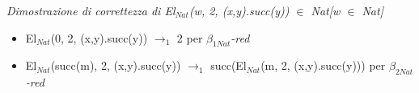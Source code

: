 \small
\begin{prooftree}
\end{prooftree}
\noindent
\normalsize \textit{Dimostrazione di correttezza di El$_{Nat}$(w, 2, (x,y).succ(y)) $\in$ Nat[w $\in$ Nat]}
\begin{itemize}
\item El$_{Nat}$(0, 2, (x,y).succ(y)) $\rightarrow_1$ 2 per \textit{$\beta_{1Nat}$-red}
\item El$_{Nat}$(succ(m), 2, (x,y).succ(y)) $\rightarrow_1$ succ(El$_{Nat}$(m, 2, (x,y).succ(y))) per \textit{$\beta_{2Nat}$-red}
\end{itemize}





